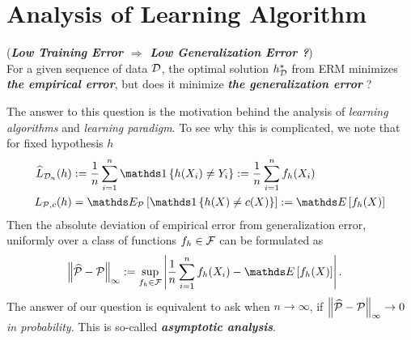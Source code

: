 \documentclass[11pt]{article}
\begin{document}
\section{Analysis of Learning Algorithm}
 \begin{remark} (\textbf{\emph{Low Training Error $\Rightarrow$ Low Generalization Error ?}}) \\
 For a given sequence of data ${\mathcal D}$, the optimal solution $h^{*}_{{\mathcal D}}$ from ERM minimizes \emph{\textbf{the empirical error}}, but does it minimize \emph{\textbf{the generalization error}} ? 

The answer to this question is the motivation behind the analysis of \emph{learning algorithms} and \emph{learning paradigm}. To see why this is complicated, we note that for fixed hypothesis $h$
\begin{align*}
\widehat{L}_{\cD_n}(h) &:=  \frac{1}{n}\sum_{i=1}^{n}\ind{h(X_i)\neq Y_i} := \frac{1}{n}\sum_{i=1}^n f_h(X_i) \\
L_{\cP, c}(h)  &=  \E{\cP}{\ind{h(X)\neq c(X)}} := \E{}{f_h(X)}
\end{align*} Then the absolute deviation of empirical error from generalization error, uniformly over a class of functions $f_h \in {\mathcal F}$ can be formulated as 
\begin{align*}
\norm{\widehat{\cP} - \cP}{\infty} &:= \sup_{f_h \in \cF}\abs{\frac{1}{n}\sum_{i=1}^n f_h(X_i) - \E{}{f_h(X)} }.
\end{align*} The answer of our question is equivalent to ask when $n \to \infty$, if $\left\|\widehat{{\mathcal P}} - {\mathcal P}\right\|_{\infty} \to 0$  \emph{in probability}. This is so-called \emph{\textbf{asymptotic analysis}}. 
\end{remark}
\end{document}
